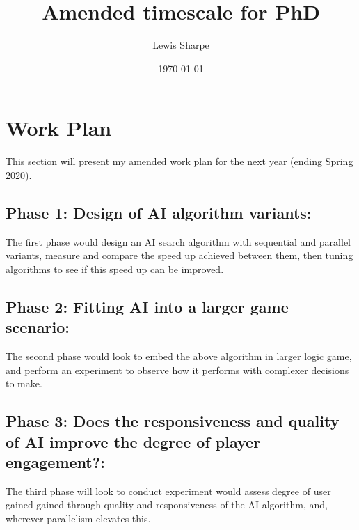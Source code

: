 \documentclass[12pt]{article}
\title{Amended timescale for PhD}
\author{
        Lewis Sharpe}
\date{\today}
\begin{document}
\maketitle
\section{Work Plan}
This section will present my amended work plan for the next year (ending Spring 2020).
\subsection{Phase 1: Design of AI algorithm variants:}
The first phase would design an AI search algorithm with sequential and parallel variants, measure and compare the speed up achieved between them, then tuning algorithms to see if this speed up can be improved. 
\subsection{Phase 2: Fitting AI into a larger game scenario:}
The second phase would look to embed the above algorithm in larger logic game, and perform an experiment to observe how it performs with complexer decisions to make. 
\subsection{Phase 3: Does the responsiveness and quality of AI improve the degree of player engagement?:}
The third phase will look to conduct experiment would assess degree of user gained gained through quality and responsiveness of the AI algorithm, and, wherever parallelism elevates this.
\end{document}

